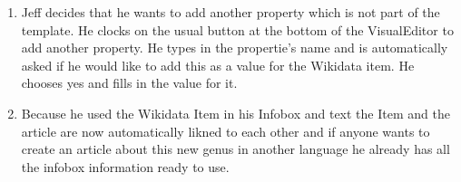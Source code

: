 \documentclass{article}
\begin{document}
\begin{enumerate}
\item Jeff decides that he wants to add another property which is not part of the template. He clocks on the usual button at the bottom of the VisualEditor to add another property. He types in the propertie's name and is automatically asked if he would like to add this as a value for the Wikidata item. He chooses yes and fills in the value for it. 
\item Because he used the Wikidata Item in his Infobox and text the Item and the article are now automatically likned to each other and if anyone wants to create an article about this new genus in another language he already has all the infobox information ready to use. 
\end{enumerate}
\end{document}
